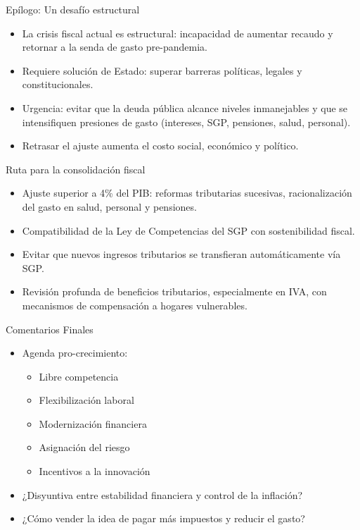 \begin{frame}{Epílogo: Un desafío estructural}
\begin{itemize}
    \item La crisis fiscal actual es estructural: incapacidad de aumentar recaudo y retornar a la senda de gasto pre-pandemia.
    \item Requiere solución de Estado: superar barreras políticas, legales y constitucionales.
    \item Urgencia: evitar que la deuda pública alcance niveles inmanejables y que se intensifiquen presiones de gasto (intereses, SGP, pensiones, salud, personal).
    \item Retrasar el ajuste aumenta el costo social, económico y político.
\end{itemize}
\end{frame}

\begin{frame}{Ruta para la consolidación fiscal}
\begin{itemize}
    \item Ajuste superior a 4\% del PIB: reformas tributarias sucesivas, racionalización del gasto en salud, personal y pensiones.
    \item Compatibilidad de la Ley de Competencias del SGP con sostenibilidad fiscal.
    \item Evitar que nuevos ingresos tributarios se transfieran automáticamente vía SGP.
    \item Revisión profunda de beneficios tributarios, especialmente en IVA, con mecanismos de compensación a hogares vulnerables.
\end{itemize}
\end{frame}
\begin{frame}{Comentarios Finales}
\begin{itemize}
    \item Agenda pro-crecimiento: 
    \begin{itemize}
        \item Libre competencia
        \item Flexibilización laboral
        \item Modernización financiera 
        \item Asignación del riesgo
        \item Incentivos a la innovación
    \end{itemize}
    \item ¿Disyuntiva entre estabilidad financiera y control de la inflación?
    \item ¿Cómo vender la idea de pagar más impuestos y reducir el gasto?
\end{itemize}
\end{frame}
